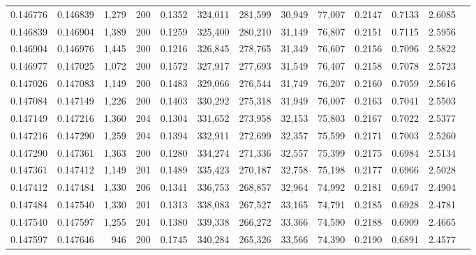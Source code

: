 \begin{tabular}{rrrrrrrrrrrrr}
0.146776 & 0.146839 & 1,279 & 200 &                                     0.1352 & 324,011 & 281,599 &  30,949 &  77,007 & 0.2147 & 0.7133 & 2.6085 \\
0.146839 & 0.146904 & 1,389 & 200 &                                     0.1259 & 325,400 & 280,210 &  31,149 &  76,807 & 0.2151 & 0.7115 & 2.5956 \\
0.146904 & 0.146976 & 1,445 & 200 &                                     0.1216 & 326,845 & 278,765 &  31,349 &  76,607 & 0.2156 & 0.7096 & 2.5822 \\
0.146977 & 0.147025 & 1,072 & 200 &                                     0.1572 & 327,917 & 277,693 &  31,549 &  76,407 & 0.2158 & 0.7078 & 2.5723 \\
0.147026 & 0.147083 & 1,149 & 200 &                                     0.1483 & 329,066 & 276,544 &  31,749 &  76,207 & 0.2160 & 0.7059 & 2.5616 \\
0.147084 & 0.147149 & 1,226 & 200 &                                     0.1403 & 330,292 & 275,318 &  31,949 &  76,007 & 0.2163 & 0.7041 & 2.5503 \\
0.147149 & 0.147216 & 1,360 & 204 &                                     0.1304 & 331,652 & 273,958 &  32,153 &  75,803 & 0.2167 & 0.7022 & 2.5377 \\
0.147216 & 0.147290 & 1,259 & 204 &                                     0.1394 & 332,911 & 272,699 &  32,357 &  75,599 & 0.2171 & 0.7003 & 2.5260 \\
0.147290 & 0.147361 & 1,363 & 200 &                                     0.1280 & 334,274 & 271,336 &  32,557 &  75,399 & 0.2175 & 0.6984 & 2.5134 \\
0.147361 & 0.147412 & 1,149 & 201 &                                     0.1489 & 335,423 & 270,187 &  32,758 &  75,198 & 0.2177 & 0.6966 & 2.5028 \\
0.147412 & 0.147484 & 1,330 & 206 &                                     0.1341 & 336,753 & 268,857 &  32,964 &  74,992 & 0.2181 & 0.6947 & 2.4904 \\
0.147484 & 0.147540 & 1,330 & 201 &                                     0.1313 & 338,083 & 267,527 &  33,165 &  74,791 & 0.2185 & 0.6928 & 2.4781 \\
0.147540 & 0.147597 & 1,255 & 201 &                                     0.1380 & 339,338 & 266,272 &  33,366 &  74,590 & 0.2188 & 0.6909 & 2.4665 \\
0.147597 & 0.147646 &   946 & 200 &                                     0.1745 & 340,284 & 265,326 &  33,566 &  74,390 & 0.2190 & 0.6891 & 2.4577 \\

\end{tabular}
